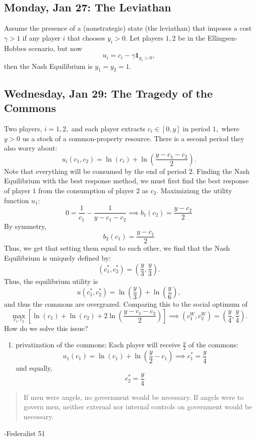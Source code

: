 \documentclass[10pt, oneside]{article}
\theoremstyle{definition}
\begin{document}
\subsection{Monday, Jan 27: The Leviathan}
Assume the presence of a (nonstrategic) state (the leviathan) that imposes a cost $\gamma >1$ if any player $i$ that chooses $y_i >0.$ Let players $1,2$ be in the Ellingsen-Hobbes scenario, but now
\[u_i = c_i - \gamma\mathbf{1}_{y_i > 0},\] then the Nash Equilibrium is $y_1 = y_2 = 1.$


\newpage
\subsection{Wednesday, Jan 29: The Tragedy of the Commons}
Two players, $i = 1,2,$ and each player extracts $c_i \in [0,y]$ in period $1,$ where $y>0$ us a stock of a common-property resource. There is a second period they also worry about:
\[u_i(c_1, c_2) = \ln(c_i) + \ln\left(\frac{y - c_1 - c_2}{2}\right).\] Note that everything will be consumed by the end of period 2. Finding the Nash Equilibrium with the best response method, we must first find the best response of player $1$ from the consumption of player $2$ as $c_2.$ Maximizizng the utility function $u_1:$
\[0 = \frac{1}{c_1} - \frac{1}{y - c_1 - c_2} \implies b_1(c_2) = \frac{y-c_2}{2}\] By symmetry, 
\[b_2(c_1) = \frac{y-c_1}{2}\]
Thus, we get that setting them equal to each other, we find that the Nash Equilibrium is uniquely defined by:
\[(c_1^\ast, c_2^\ast) = (\frac{y}{3}, \frac{y}{3}).\] Thus, the equilibrium utility is 
\[u(c_1^\ast, c_2^\ast) = \ln(\frac{y}{3}) + \ln(\frac{y}{6}),\] and thus the commons are overgrazed. Comparing this to the social optimum of 
\[\max_{c_1, c_2}\left[\ln(c_1) + \ln(c_2) + 2\ln\left(\frac{y - c_1 - c_2}{2}\right)\right] \implies (c_1^W, c_2^W) = (\frac{y}{4}, \frac{y}{4}).\] How do we solve this issue?
\begin{enumerate}
    \item privatization of the commons: Each player will receive $\frac{y}{2}$ of the commons:
    \[u_1(c_1) = \ln(c_1) + \ln\left(\frac{y}{2} - c_1\right) \implies c_1^\ast = \frac{y}{4}\] and equally, 
    \[c_2^\ast = \frac{y}{4}\]
\end{enumerate}

\begin{quote}
    If men were angels, no government would be necessary. If angels were to govern men, neither external nor internal controls on government would be necessary.
\end{quote}
\tab -Federalist 51
\end{document}

